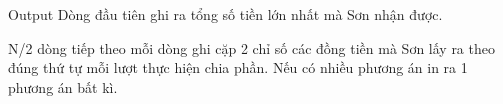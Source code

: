 Output
Dòng đầu tiên ghi ra tổng số tiền lớn nhất mà Sơn nhận được.

N/2 dòng tiếp theo mỗi dòng ghi cặp 2 chỉ số các đồng tiền mà Sơn lấy ra theo đúng thứ tự mỗi lượt thực hiện chia phần. Nếu có nhiều phương án in ra 1 phương án bất kì.